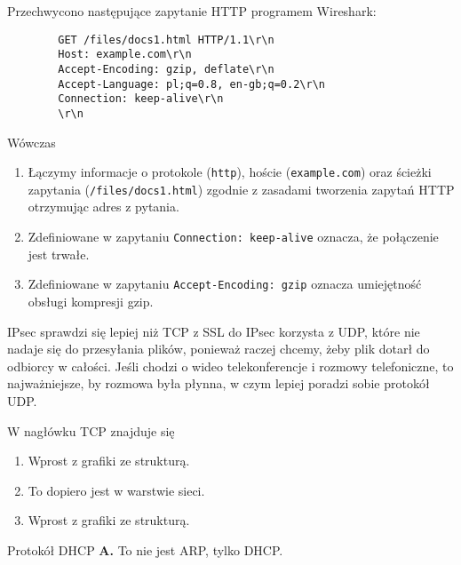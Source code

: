 \begin{solutions}
    \sol Przechwycono następujące zapytanie HTTP programem Wireshark:
    \begin{verbatim}
        GET /files/docs1.html HTTP/1.1\r\n
        Host: example.com\r\n
        Accept-Encoding: gzip, deflate\r\n
        Accept-Language: pl;q=0.8, en-gb;q=0.2\r\n
        Connection: keep-alive\r\n
        \r\n
    \end{verbatim}
    Wówczas

    \begin{enumerate} [\bf A.]
        \item Łączymy informacje o protokole (\texttt{http}), hoście (\texttt{example.com}) oraz ścieżki zapytania (\texttt{/files/docs1.html}) zgodnie z zasadami tworzenia zapytań HTTP otrzymując adres z pytania.
        \item  Zdefiniowane w zapytaniu \texttt{Connection: keep-alive} oznacza, że połączenie jest trwałe.
        \item  Zdefiniowane w zapytaniu \texttt{Accept-Encoding: gzip} oznacza umiejętność obsługi kompresji gzip.
    \end{enumerate}

    \sol IPsec sprawdzi się lepiej niż TCP z SSL do
    IPsec korzysta z UDP, które nie nadaje się do przesyłania plików, ponieważ raczej chcemy, żeby plik dotarł do odbiorcy w całości. Jeśli chodzi o wideo telekonferencje i rozmowy telefoniczne, to najważniejsze, by rozmowa była płynna, w czym lepiej poradzi sobie protokół UDP.

    \sol W nagłówku TCP znajduje się
    \begin{enumerate} [\bf A.]
        \item Wprost z grafiki ze strukturą.
        \item To dopiero jest w warstwie sieci.
        \item Wprost z grafiki ze strukturą.
    \end{enumerate}

    \sol Protokół DHCP
    \textbf{A.} To nie jest ARP, tylko DHCP.


\end{solutions}
